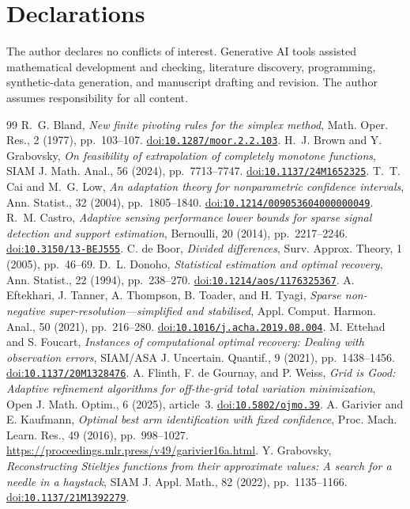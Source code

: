 \documentclass[10pt]{amsart}
\theoremstyle{definition}
\theoremstyle{remark}
\newcommand{\doi}[1]{\href{https://doi.org/#1}{doi:\nolinkurl{#1}}}
\begin{document}
\section*{Declarations}
The author declares no conflicts of interest. Generative AI tools assisted mathematical development and checking, literature discovery, programming, synthetic-data generation, and manuscript drafting and revision. The author assumes responsibility for all content.
\begin{thebibliography}{99}
 R.~G. Bland, \emph{New finite pivoting rules for the simplex method}, Math. Oper. Res., 2 (1977), pp.~103--107. \doi{10.1287/moor.2.2.103}.
 H.~J. Brown and Y. Grabovsky, \emph{On feasibility of extrapolation of completely monotone functions}, SIAM J. Math. Anal., 56 (2024), pp.~7713--7747. \doi{10.1137/24M1652325}.
 T.~T. Cai and M.~G. Low, \emph{An adaptation theory for nonparametric confidence intervals}, Ann. Statist., 32 (2004), pp.~1805--1840. \doi{10.1214/009053604000000049}.
 R.~M. Castro, \emph{Adaptive sensing performance lower bounds for sparse signal detection and support estimation}, Bernoulli, 20 (2014), pp.~2217--2246. \doi{10.3150/13-BEJ555}.
 C. de Boor, \emph{Divided differences}, Surv. Approx. Theory, 1 (2005), pp.~46--69.
 D.~L. Donoho, \emph{Statistical estimation and optimal recovery}, Ann. Statist., 22 (1994), pp.~238--270. \doi{10.1214/aos/1176325367}.
 A. Eftekhari, J. Tanner, A. Thompson, B. Toader, and H. Tyagi, \emph{Sparse non-negative super-resolution---simplified and stabilised}, Appl. Comput. Harmon. Anal., 50 (2021), pp.~216--280. \doi{10.1016/j.acha.2019.08.004}.
 M. Ettehad and S. Foucart, \emph{Instances of computational optimal recovery: Dealing with observation errors}, SIAM/ASA J. Uncertain. Quantif., 9 (2021), pp.~1438--1456. \doi{10.1137/20M1328476}.
 A. Flinth, F. de Gournay, and P. Weiss, \emph{Grid is Good: Adaptive refinement algorithms for off-the-grid total variation minimization}, Open J. Math. Optim., 6 (2025), article~3. \doi{10.5802/ojmo.39}.
 A. Garivier and E. Kaufmann, \emph{Optimal best arm identification with fixed confidence}, Proc. Mach. Learn. Res., 49 (2016), pp.~998--1027. \url{https://proceedings.mlr.press/v49/garivier16a.html}.
 Y. Grabovsky, \emph{Reconstructing Stieltjes functions from their approximate values: A search for a needle in a haystack}, SIAM J. Appl. Math., 82 (2022), pp.~1135--1166. \doi{10.1137/21M1392279}.

\end{thebibliography}
\end{document}

